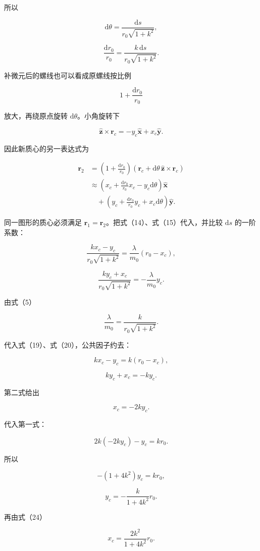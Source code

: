 \documentclass[12pt,a4paper,UTF8]{ctexart}
\begin{document}
所以

\[
\mathrm d\theta
=\frac{\mathrm ds}{r_0\sqrt{1+k^2}}, \tag{14}
\]

\[
\frac{\mathrm dr_0}{r_0}
=\frac{k\,\mathrm ds}{r_0\sqrt{1+k^2}}. \tag{15}
\]

补微元后的螺线也可以看成原螺线按比例

\[
1+\frac{\mathrm dr_0}{r_0} \tag{16}
\]

放大，再绕原点旋转 \(\mathrm d\theta\)。小角旋转下

\[
\hat{\bm z}\times\bm r_c
=-y_c\hat{\bm x}+x_c\hat{\bm y}. \tag{17}
\]

因此新质心的另一表达式为

\[
\begin{aligned}
\bm r_2
&=\left(1+\frac{\mathrm dr_0}{r_0}\right)
\left(\bm r_c+\mathrm d\theta\,\hat{\bm z}\times\bm r_c\right)\\
&\approx
\left(x_c+\frac{\mathrm dr_0}{r_0}x_c-y_c\mathrm d\theta\right)\hat{\bm x}\\
&\quad+
\left(y_c+\frac{\mathrm dr_0}{r_0}y_c+x_c\mathrm d\theta\right)\hat{\bm y}.
\end{aligned} \tag{18}
\]

同一图形的质心必须满足
\(\bm r_1=\bm r_2\)。把式（14）、式（15）代入，并比较 \(\mathrm ds\)
的一阶系数：

\[
\frac{kx_c-y_c}{r_0\sqrt{1+k^2}}
=\frac{\lambda}{m_0}(r_0-x_c), \tag{19}
\]

\[
\frac{ky_c+x_c}{r_0\sqrt{1+k^2}}
=-\frac{\lambda}{m_0}y_c. \tag{20}
\]

由式（5）

\[
\frac{\lambda}{m_0}
=\frac{k}{r_0\sqrt{1+k^2}}. \tag{21}
\]

代入式（19）、式（20），公共因子约去：

\[
kx_c-y_c=k(r_0-x_c), \tag{22}
\]

\[
ky_c+x_c=-ky_c. \tag{23}
\]

第二式给出

\[
x_c=-2ky_c. \tag{24}
\]

代入第一式：

\[
2k(-2ky_c)-y_c=kr_0. \tag{25}
\]

所以

\[
-(1+4k^2)y_c=kr_0, \tag{26}
\]

\[
\boxed{y_c=-\frac{k}{1+4k^2}r_0}. \tag{27}
\]

再由式（24）

\[
\boxed{x_c=\frac{2k^2}{1+4k^2}r_0}. \tag{28}
\]
\end{document}
